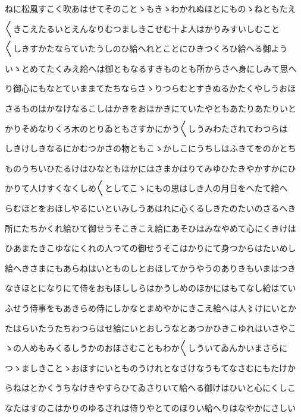 \documentclass[a4paper,11pt,landscape]{ltjtarticle}
\begin{document}
\par\medskip
ねに松風すこく吹あはせてそのことゝもきゝわかれぬほとにものゝねともたえ
\par\medskip
〱きこえたるいとえんなりむつましきこせむ十よ人はかりみすいしむこと
\par\medskip
〱しきすかたならていたうしのひ給へれとことにひきつくろひ給へる御よう
\par\medskip
いゝとめてたくみえ給へは御ともなるすきものとも所からさへ身にしみて思へ
\par\medskip
り御心にもなとていままてたちならさゝりつらむとすきぬるかたくやしうおほ
\par\medskip
さるものはかなけなるこしはかきをおほかきにていたやともあたりあたりいと
\par\medskip
かりそめなりくろ木のとりゐともさすかにかう〱しうみわたされてわつらは
\par\medskip
しきけしきなるにかむつかさの物ともこゝかしこにうちしはふきてをのかとち
\par\medskip
ものうちいひたるけはひなともほかにはさまかはりてみゆひたきやかすかにひ
\par\medskip
かりて人けすくなくしめ〱としてこゝにもの思はしき人の月日をへたて給へ
\par\medskip
らむほとをおほしやるにいといみしうあはれに心くるしきたのたいのさるへき
\par\medskip
所にたちかくれ給ひて御せうそこきこえ給にあそひはみなやめて心にくきけは
\par\medskip
ひあまたきこゆなにくれの人つての御せうそこはかりにて身つからはたいめし
\par\medskip
給へきさまにもあらねはいとものしとおほしてかうやうのありきもいまはつき
\par\medskip
なきほとになりにて侍をおもほししらはかうしめのほかにはもてなし給はてい
\par\medskip
ふせう侍事をもあきらめ侍にしかなとまめやかにきこえ給へは人〻けにいとか
\par\medskip
たはらいたうたちわつらはせ給にいとおしうなとあつかひきこゆれはいさやこ
\par\medskip
ゝの人めもみくるしうかのおほさむこともわか〱しういてゐんかいまさらに
\par\medskip
つゝましきことゝおほすにいとものうけれとなさけなうもてなさむにもたけか
\par\medskip
らねはとかくうちなけきやすらひてゐさりいて給へる御けはひいと心にくしこ
\par\medskip
なたはすのこはかりのゆるされは侍りやとてのほりい給へりはなやかにさしい
\par\medskip
\end{document}
